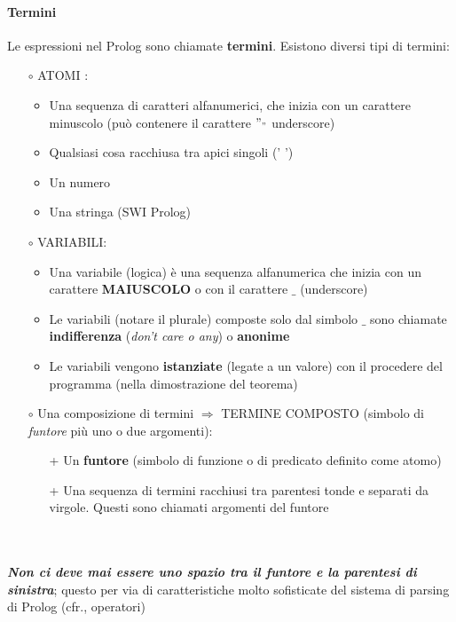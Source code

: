 \documentclass[11pt]{article}
\begin{document}
\paragraph{Termini} Le espressioni nel Prolog sono chiamate \color{red}\textbf{termini}\color{black}. Esistono diversi tipi di termini:
\begin{itemize}
	\item[$\circ$]ATOMI :
	\begin{itemize}
	
	\item Una sequenza di caratteri alfanumerici, che inizia con un carattere minuscolo (può contenere il carattere $"_"$ underscore)
	\item Qualsiasi cosa racchiusa tra apici singoli (' ')
	\item Un numero
	\item Una stringa (SWI Prolog)
\end{itemize}
	\item[$\circ$]VARIABILI:
	\begin{itemize}
	
	\item Una variabile (logica) è una sequenza alfanumerica che inizia con un carattere \textbf{MAIUSCOLO} o con il carattere $\_$ (underscore)
	\item Le variabili (notare il plurale) composte solo dal simbolo $\_$ sono chiamate \textbf{indifferenza} (\textit{don’t care o any}) o \textbf{anonime}
	\item Le variabili vengono \textbf{istanziate} (legate a un valore) con il
procedere del programma (nella dimostrazione del teorema)
\end{itemize}
	\item[$\circ$]Una composizione di termini $\Rightarrow$ TERMINE COMPOSTO (simbolo di \color{red}\textit{funtore} \color{black} più uno o due argomenti):
	\begin{itemize}
		\item[+] Un \textbf{funtore} (simbolo di funzione o di predicato definito come atomo)
		\item[+] Una sequenza di termini racchiusi tra parentesi tonde e
separati da virgole. Questi sono chiamati argomenti del funtore
	\end{itemize}
	
\end{itemize}
\danger\medspace\danger \hfill \danger\medspace\danger
\\ \\
\textbf{\emph{Non ci deve mai essere uno spazio tra il funtore e la parentesi di
sinistra}}; questo per via di caratteristiche molto sofisticate del
sistema di parsing di Prolog (cfr., operatori)
\\ \\
\danger\medspace\danger \hfill \danger\medspace\danger
\\ \\
\end{document}
